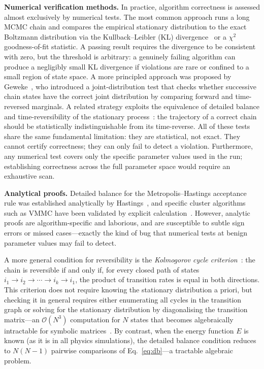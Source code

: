 \documentclass[twocolumn,10pt]{article}
\begin{document}
\medskip\noindent\textbf{Numerical verification methods.}
In practice, algorithm correctness is assessed almost exclusively by numerical
tests.  The most common approach runs a long MCMC chain and compares the
empirical stationary distribution to the exact Boltzmann distribution via the
Kullback--Leibler (KL) divergence~\cite{Newman1999} or a $\chi^2$
goodness-of-fit statistic.  A passing result requires the divergence to be
consistent with zero, but the threshold is arbitrary: a genuinely failing
algorithm can produce a negligibly small KL divergence if violations are rare
or confined to a small region of state space.  A more principled approach was
proposed by Geweke~\cite{Geweke2004}, who introduced a joint-distribution test
that checks whether successive chain states have the correct joint distribution
by comparing forward and time-reversed marginals.  A related strategy exploits
the equivalence of detailed balance and time-reversibility of the stationary
process~\cite{Kelly1979}: the trajectory of a correct chain should be
statistically indistinguishable from its time-reverse.  All of these tests share
the same fundamental limitation: they are statistical, not exact.  They cannot
certify correctness; they can only fail to detect a violation.  Furthermore, any
numerical test covers only the specific parameter values used in the run;
establishing correctness across the full parameter space would require an
exhaustive scan.

\medskip\noindent\textbf{Analytical proofs.}
Detailed balance for the Metropolis--Hastings acceptance rule was established
analytically by Hastings~\cite{Hastings1970}, and specific cluster algorithms
such as VMMC have been validated by explicit calculation~\cite{Whitelam2007}.
However, analytic proofs are algorithm-specific and laborious, and are
susceptible to subtle sign errors or missed cases---exactly the kind of bug that
numerical tests at benign parameter values may fail to detect.

A more general condition for reversibility is the \emph{Kolmogorov cycle
criterion}~\cite{Kelly1979,Norris1998}: the chain is reversible if and only if,
for every closed path of states $i_1\to i_2\to\cdots\to i_k\to i_1$, the
product of transition rates is equal in both directions.  This criterion does not
require knowing the stationary distribution a priori, but checking it in general
requires either enumerating all cycles in the transition graph or solving for the
stationary distribution by diagonalising the transition matrix---an $\mathcal{O}(N^3)$
computation for $N$ states that becomes algebraically intractable for symbolic
matrices~\cite{Norris1998}.  By contrast, when the energy function $E$ is known
(as it is in all physics simulations), the detailed balance condition reduces to
$N(N-1)$ pairwise comparisons of Eq.~\eqref{eq:db}---a tractable algebraic
problem.
\end{document}
